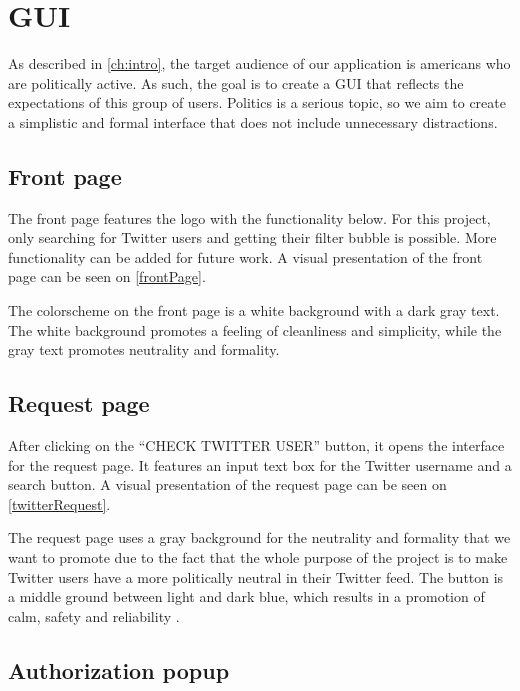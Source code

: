 \chapter{GUI} \label{GUI}
As described in \autoref{ch:intro}, the target audience of our application is
americans who are politically active. As such, the goal is to create a GUI
that reflects the expectations of this group of users. Politics is a serious
topic, so we aim to create a simplistic and formal interface that does not
include unnecessary distractions.

\section{Front page}
The front page features the logo with the functionality below. For this
project, only searching for Twitter users and getting their filter bubble is
possible. More functionality can be added for future work. A visual
presentation of the front page can be seen on \autoref{frontPage}.

{}

The colorscheme on the front page is a white background with a dark gray text.
The white background promotes a feeling of cleanliness and simplicity, while the
gray text promotes neutrality and formality\citep[p. 63 \& 64]{WebUI}. 

\section{Request page}
After clicking on the ``CHECK TWITTER USER'' button, it opens the interface for
the request page. It features an input text box for the Twitter username and a
search button. A visual presentation of the request page can be seen on \autoref{twitterRequest}.


The request page uses a gray background for the neutrality and formality that we
want to promote due to the fact that the whole purpose of the project is to
make Twitter users have a more politically neutral in their Twitter feed.
The button is a middle ground between light and dark blue, which results in
a promotion of calm, safety and reliability \citep[p. 61 \& 64]{WebUI}.

\section{Authorization popup}

